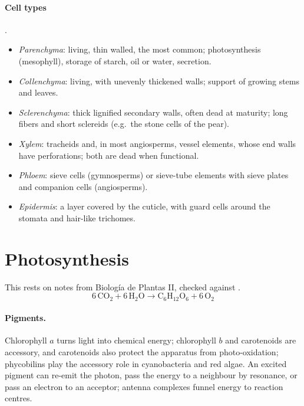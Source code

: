 \paragraph{Cell types}
\cite[Chapter 23]{evert2013raven}.
\begin{itemize}
\item \emph{Parenchyma}: living, thin
walled, the most common; photosynthesis
(mesophyll), storage of starch, oil or
water, secretion.
\item \emph{Collenchyma}: living, with
unevenly thickened walls; support of
growing stems and leaves.
\item \emph{Sclerenchyma}: thick lignified
secondary walls, often dead at maturity;
long fibers and short sclereids (e.g.\ the
stone cells of the pear).
\item \emph{Xylem}: tracheids and, in most
angiosperms, vessel elements, whose end
walls have perforations; both are dead
when functional.
\item \emph{Phloem}: sieve cells
(gymnosperms) or sieve-tube elements with
sieve plates and companion cells
(angiosperms).
\item \emph{Epidermis}: a layer covered by
the cuticle, with guard cells around the
stomata and hair-like trichomes.
\end{itemize}

\section{Photosynthesis}
\label{section-photosynthesis}

This rests on notes from
Biolog\'ia de Plantas II, checked against
\cite[Chapter 7]{evert2013raven}.
$$
\mathrm{6\,CO_2 + 6\,H_2O
\rightarrow C_6H_{12}O_6 + 6\,O_2}
$$

\paragraph{Pigments.}
Chlorophyll $a$ turns light into chemical
energy; chlorophyll $b$ and carotenoids are
accessory, and carotenoids also protect the
apparatus from photo-oxidation;
phycobilins play the accessory role in
cyanobacteria and red algae. An excited
pigment can re-emit the photon, pass the
energy to a neighbour by resonance, or pass
an electron to an acceptor; antenna
complexes funnel energy to reaction centres.

